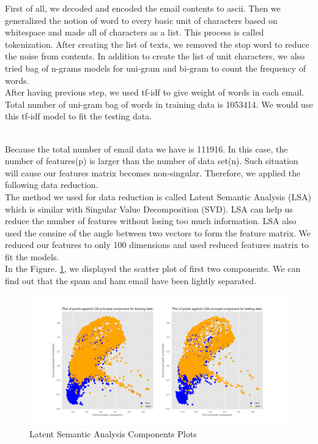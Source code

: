 
First of all, we decoded and encoded the email contents to ascii. Then we generalized the notion of word to every basic unit of characters based on whitespace and made all of characters as a list. This process is called tokenization. After creating the list of texts, we removed the stop word to reduce the noise from contents. In addition to create the list of unit characters, we also tried bag of n-grams models for uni-gram and bi-gram to count the frequency of words.\\

After having previous step, we used tf-idf to give weight of words in each email. Total number of uni-gram bag of words in training data is 1053414. We would use this tf-idf model to fit the testing data. \\\

Because the total number of email data we have is 111916. In this case, the number of features(p) is larger than the number of data set(n). Such situation will cause our features matrix becomes non-singular. Therefore, we applied the following data reduction.\\

The method we used for data reduction is called Latent Semantic Analysis (LSA) which is similar with Singular Value Decomposition (SVD). LSA can help us reduce the number of features without losing too much information. LSA also used the consine of the angle between two vectors to form the feature matrix. We reduced our features to only 100 dimensions and used reduced features matrix to fit the models.\\

In the Figure. \ref{FE}, we displayed the scatter plot of first two components. We can find out that the spam and ham email have been lightly separated.

\begin{figure}[H]
    \centering
    \includegraphics[scale=0.3]{./plots/data_reduction_cp12.png}
    \caption{Latent Semantic Analysis Components Plots}
    \label{FE}
\end{figure}

